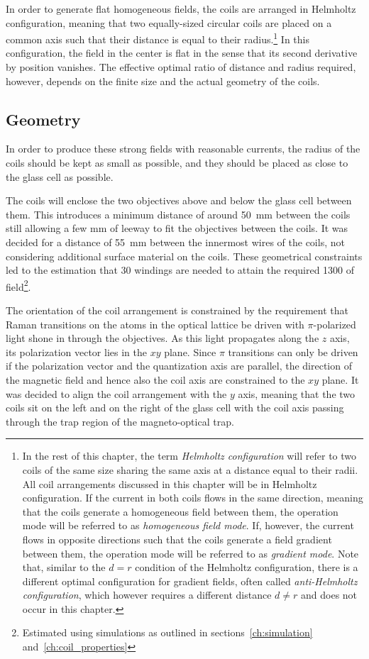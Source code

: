 In order to generate flat homogeneous fields, the coils are arranged in Helmholtz configuration, meaning that two equally-sized circular coils are placed on a common axis such that their distance is equal to their radius.\footnote{In the rest of this chapter, the term \textit{Helmholtz configuration} will refer to two coils of the same size sharing the same axis at a distance equal to their radii. All coil arrangements discussed in this chapter will be in Helmholtz configuration. If the current in both coils flows in the same direction, meaning that the coils generate a homogeneous field between them, the operation mode will be referred to as \textit{homogeneous field mode}. If, however, the current flows in opposite directions such that the coils generate a field gradient between them, the operation mode will be referred to as \textit{gradient mode}. Note that, similar to the $d = r$ condition of the Helmholtz configuration, there is a different optimal configuration for gradient fields, often called \textit{anti-Helmholtz configuration}, which however requires a different distance $d \neq r$ and does not occur in this chapter.} In this configuration, the field in the center is flat in the sense that its second derivative by position vanishes. The effective optimal ratio of distance and radius required, however, depends on the finite size and the actual geometry of the coils.

\subsection*{Geometry}
In order to produce these strong fields with reasonable currents, the radius of the coils should be kept as small as possible, and they should be placed as close to the glass cell as possible.

The coils will enclose the two objectives above and below the glass cell between them. This introduces a minimum distance of around \SI{50}{\milli\meter} between the coils still allowing a few \si[]{\milli\meter} of leeway to fit the objectives between the coils. It was decided for a distance of \SI{55}{\milli\meter} between the innermost wires of the coils, not considering additional surface material on the coils. These geometrical constraints led to the estimation that 30 windings are needed to attain the required \SI{1300}{\gauss} of field\footnote{Estimated using simulations  as outlined in sections~\ref{ch:simulation} and~\ref{ch:coil_properties}}.

The orientation of the coil arrangement is constrained by the requirement that Raman transitions on the atoms in the optical lattice be driven with $\pi$-polarized light shone in through the objectives. As this light propagates along the $z$ axis, its polarization vector lies in the $xy$ plane. Since $\pi$ transitions can only be driven if the polarization vector and the quantization axis are parallel, the direction of the magnetic field and hence also the coil axis are constrained to the $xy$ plane. It was decided to align the coil arrangement with the $y$ axis, meaning that the two coils sit on the left and on the right of the glass cell with the coil axis passing through the trap region of the magneto-optical trap.

